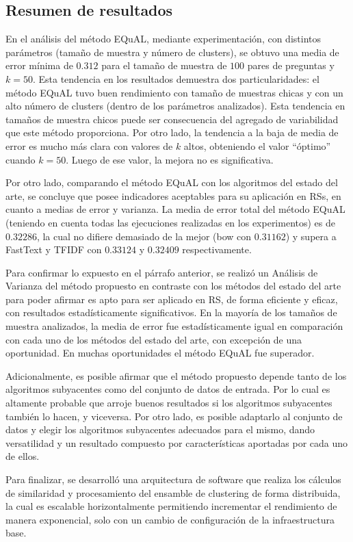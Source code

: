 \subsection{Resumen de resultados}

En el análisis del método EQuAL, mediante experimentación, con distintos parámetros (tamaño de muestra y número de clusters), se obtuvo una media de error mínima de \(0.312\) para el tamaño de muestra de \(100\) pares de preguntas y \(k = 50\). Esta tendencia en los resultados demuestra dos particularidades: el método EQuAL tuvo buen rendimiento con tamaño de muestras chicas y con un alto número de clusters (dentro de los parámetros analizados). Esta tendencia en tamaños de muestra chicos puede ser consecuencia del agregado de variabilidad que este método proporciona. Por otro lado, la tendencia a la baja de media de error es mucho más clara con valores de \(k\) altos, obteniendo el valor “óptimo” cuando \(k = 50\). Luego de ese valor, la mejora no es significativa.

\bigskip Por otro lado, comparando el método EQuAL con los algoritmos del estado del arte, se concluye que posee indicadores aceptables para su aplicación en RSs, en cuanto a medias de error y varianza. La media de error total del método EQuAL (teniendo en cuenta todas las ejecuciones realizadas en los experimentos) es de \(0.32286\), la cual no difiere demasiado de la mejor (bow con \(0.31162\)) y supera a FastText y TFIDF con \(0.33124\) y \(0.32409\) respectivamente.

\bigskip Para confirmar lo expuesto en el párrafo anterior, se realizó un Análisis de Varianza del método propuesto en contraste con los métodos del estado del arte para poder afirmar es apto para ser aplicado en RS, de forma eficiente y eficaz, con resultados estadísticamente significativos. En la mayoría de los tamaños de muestra analizados, la media de error fue estadísticamente igual en comparación con cada uno de los métodos del estado del arte, con excepción de una oportunidad. En muchas oportunidades el método EQuAL fue superador.

\bigskip Adicionalmente, es posible afirmar que el método propuesto depende tanto de los algoritmos subyacentes como del conjunto de datos de entrada. Por lo cual es altamente probable que arroje buenos resultados si los algoritmos subyacentes también lo hacen, y viceversa. Por otro lado, es posible adaptarlo al conjunto de datos y elegir los algoritmos subyacentes adecuados para el mismo, dando versatilidad y un resultado compuesto por características aportadas por cada uno de ellos.

\bigskip Para finalizar, se desarrolló una arquitectura de software que realiza los cálculos de similaridad y procesamiento del ensamble de clustering de forma distribuida, la cual es escalable horizontalmente permitiendo incrementar el rendimiento de manera exponencial, solo con un cambio de configuración de la infraestructura base.
